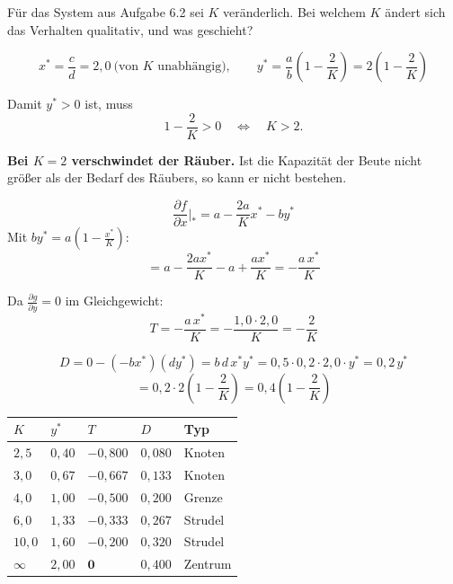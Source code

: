 \begin{aufgabe}
Für das System aus Aufgabe 6.2 sei $K$ veränderlich. Bei welchem $K$ ändert sich das Verhalten qualitativ, und was geschieht?

\loesung
{}
\[ x^{*} = \frac{c}{d} = 2{,}0 \ \text{(von $K$ unabhängig)}, \qquad y^{*} = \frac{a}{b}\left(1-\frac{2}{K}\right) = 2\left(1-\frac{2}{K}\right) \]

Damit $y^{*} > 0$ ist, muss
\[ 1 - \frac{2}{K} > 0 \quad\Longleftrightarrow\quad K > 2 . \]

\begin{center}
\begin{minipage}{0.9\textwidth}
\textbf{Bei $K = 2$ verschwindet der Räuber.} Ist die Kapazität der Beute nicht größer als der Bedarf des Räubers, so kann er nicht bestehen.
\end{minipage}
\end{center}

\[ \frac{\partial f}{\partial x}\Big|_{*} = a - \frac{2a}{K}x^{*} - by^{*} \]
Mit $by^{*} = a\left(1-\frac{x^{*}}{K}\right)$:
\[ = a - \frac{2a x^{*}}{K} - a + \frac{ax^{*}}{K} = -\frac{a\,x^{*}}{K} \]

Da $\frac{\partial g}{\partial y} = 0$ im Gleichgewicht:
\[ T = -\frac{a\,x^{*}}{K} = -\frac{1{,}0 \cdot 2{,}0}{K} = -\frac{2}{K} \]

\[ D = 0 - (-b x^{*})(d y^{*}) = b\,d\,x^{*}y^{*} = 0{,}5 \cdot 0{,}2 \cdot 2{,}0 \cdot y^{*} = 0{,}2\,y^{*} \]
\[ = 0{,}2 \cdot 2\left(1-\frac{2}{K}\right) = 0{,}4\left(1-\frac{2}{K}\right) \]

\begin{center}
{\small
\renewcommand{\arraystretch}{1.48}
\begin{tabular}{@{}P{1.4cm}P{1.6cm}P{1.8cm}P{1.6cm}P{2.0cm}@{}}
\toprule
$K$ & $y^{*}$ & $T$ & $D$ & \textbf{Typ}\\
\midrule
$2{,}5$ & $0{,}40$ & $-0{,}800$ & $0{,}080$ & Knoten\\
$3{,}0$ & $0{,}67$ & $-0{,}667$ & $0{,}133$ & Knoten\\
$4{,}0$ & $1{,}00$ & $-0{,}500$ & $0{,}200$ & \textcolor{akzent}{Grenze}\\
$6{,}0$ & $1{,}33$ & $-0{,}333$ & $0{,}267$ & Strudel\\
$10{,}0$ & $1{,}60$ & $-0{,}200$ & $0{,}320$ & Strudel\\
$\infty$ & $2{,}00$ & $\mathbf{0}$ & $0{,}400$ & \textcolor{tief}{Zentrum}\\
\bottomrule
\end{tabular}}
\end{center}


\end{aufgabe}
